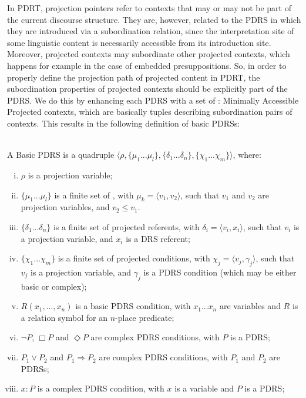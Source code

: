 In PDRT, projection pointers refer to contexts that may or may not be part
of the current discourse structure. They are, however, related to the PDRS
in which they are introduced via a subordination relation, since the
interpretation site of some linguistic content is necessarily accessible
from its introduction site. Moreover, projected contexts may subordinate
other projected contexts, which happens for example in the case of embedded
presuppositions. So, in order to properly define the projection path of
projected content in PDRT, the subordination properties of projected
contexts should be explicitly part of the PDRS. We do this by enhancing each
PDRS with a set of \MAPs: Minimally Accessible Projected contexts, which are
basically tuples describing subordination pairs of contexts. This results in
the following definition of basic PDRSs:

\begin{definition} \label{def:bPDRS}~\\
A Basic PDRS is a quadruple $\langle \rho, \{\mu_1 ... \mu_l\}, 
\{\delta_1 ... \delta_n\}, \{\chi_1 ... \chi_m\}\rangle$, where:
  \begin{enumerate}[i.]
    \item $\rho$ is a projection variable;
    \item $\{\mu_1 ... \mu_l\}$ is a finite set of \MAPs, with $\mu_k=\langle
      v_1,v_2\rangle$, such that $v_1$ and $v_2$ are projection variables,
      and $v_2\leq v_1$.
    \item $\{\delta_1 ... \delta_n\}$ is a finite set of projected
      referents, with $\delta_i=\langle v_i, x_i\rangle$, such that $v_i$ is
      a projection variable, and $x_i$ is a DRS referent;
    \item $\{\chi_1 ... \chi_m\}$ is a finite set of projected conditions,
      with $\chi_j = \langle v_j,\gamma_j\rangle$, such that $v_j$ is a
      projection variable, and $\gamma_j$ is a PDRS condition (which may be
      either basic or complex);
    \item \label{def:bPDRS:Rel} $R(x_1, ..., x_n)$ is a basic PDRS condition,
      with $x_1 ... x_n$ are variables and $R$ is a relation symbol for an
      $n$-place predicate;
    \item $\neg P$, $\Box P$ and $\Diamond P$ are complex PDRS conditions,
      with $P$ is a PDRS;
    \item $P_1 \vee P_2$ and $P_1 \Rightarrow P_2$ are complex PDRS
      conditions, with $P_1$ and $P_2$ are PDRSs;
    \item\label{def:bPDRS:Prop} $x:P$ is a complex PDRS condition, with $x$
      is a variable and $P$ is a PDRS;
  \end{enumerate}
\end{definition}


